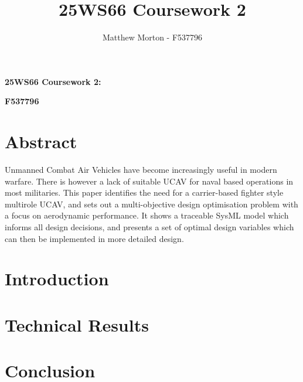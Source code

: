 \documentclass[11pt]{article}
\title{25WS66 Coursework 2}
\author{Matthew Morton - F537796}
\begin{document}
\begin{center}
    \textbf{25WS66 Coursework 2: }

    \textbf{F537796}
\end{center}

\linespread{1.15}

\section*{Abstract}
Unmanned Combat Air Vehicles have become increasingly useful in modern warfare.
There is however a lack of suitable UCAV for naval based operations in most militaries.
This paper identifies the need for a carrier-based fighter style multirole UCAV, and sets out a multi-objective design optimisation problem with a focus on aerodynamic performance.
It shows a traceable SysML model which informs all design decisions, and presents a set of optimal design variables which can then be implemented in more detailed design.

\hrulefill

\tableofcontents

\hrulefill

\clearpage

\section{Introduction}



\clearpage

\section{Technical Results}



\clearpage

\section{Conclusion}



\clearpage

\printbibliography[heading=bibintoc, title=References]{}
\end{document}
